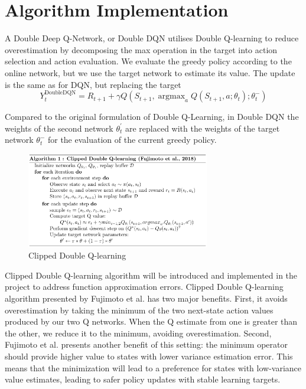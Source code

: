 \documentclass{article}
\DeclareMathOperator*{\argmax}{argmax}
\begin{document}
\section{Algorithm Implementation}



A Double Deep Q-Network, or Double DQN utilises Double Q-learning to reduce
overestimation by decomposing the max operation in the target into action
selection and action evaluation. We evaluate the greedy policy according to the
online network, but we use the target network to estimate its value. The update
is the same as for DQN, but replacing the target
\[
    Y_{t}^{\text{DoubleDQN}} = R_{t+1} + \gamma Q(S_{t+1}, \argmax_a Q(S_{t+1},
    a; \theta _{t});\theta _{t}^{-})
\]

Compared to the original formulation of Double Q-Learning, in Double DQN the
weights of the second network $\theta _{t}^{'}$ are replaced with the weights of
the target network $\theta_{t}^{-}$ for the evaluation of the current greedy
policy.

\begin{figure}[!htbp]
    \begin{center}
    \includegraphics[width=8cm]{alg1_ClippedDDQ_Fujimoto.png}
    \end{center}
    \caption{Clipped Double Q-learning}
    \label{fig:numcomments}
\end{figure}

Clipped Double Q-learning algorithm will be introduced and implemented in the
project to address function approximation errors. Clipped Double Q-learning
algorithm presented by Fujimoto et al. has two major benefits. First, it avoids
overestimation by taking the minimum of the two next-state action values
produced by our two Q networks. When the Q estimate from one is greater than the
other, we reduce it to the minimum, avoiding overestimation. Second, Fujimoto et
al. presents another benefit of this setting: the minimum operator should
provide higher value to states with lower variance estimation error.  This means
that the minimization will lead to a preference for states with low-variance
value estimates, leading to safer policy updates with stable learning targets.
\end{document}
